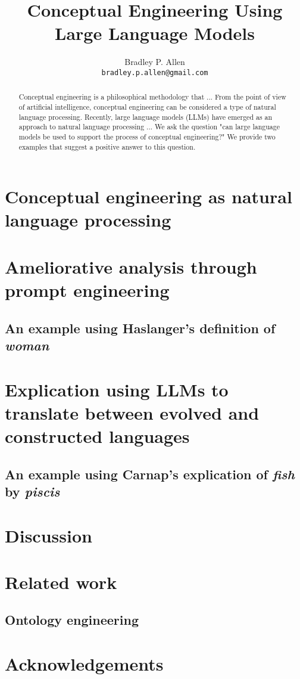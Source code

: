 \documentclass{article}
\title{Conceptual Engineering Using Large Language Models}
\author{Bradley P. Allen\\
\texttt{bradley.p.allen@gmail.com} \\
}
\begin{document}
\maketitle

\begin{abstract}
Conceptual engineering is a philosophical methodology that ... From the point of view of artificial intelligence, conceptual engineering can be considered a type of natural language processing. Recently, large language models (LLMs) have emerged as an approach to natural language processing ... We ask the question "can large language models be used to support the process of conceptual engineering?" We provide two examples that suggest a positive answer to this question. 
\end{abstract}


\section{Conceptual engineering as natural language processing}

\section{Ameliorative analysis through prompt engineering}

\subsection{An example using Haslanger's definition of \textit{woman}}

\section{Explication using LLMs to translate between evolved and constructed languages}

\subsection{An example using Carnap's explication of \textit{fish} by \textit{piscis}}

\section{Discussion}

\section{Related work}

\subsection{Ontology engineering}

\section{Acknowledgements}

\nocite{*}



\end{document}
